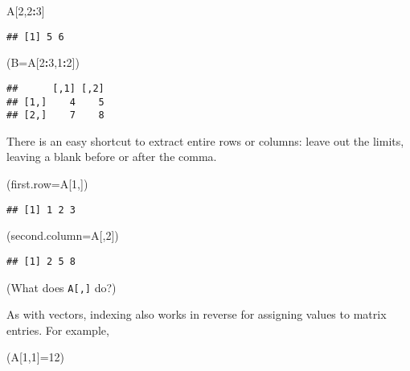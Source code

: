 \documentclass[11pt,]{article}
\newenvironment{Shaded}{\begin{snugshade}}{\end{snugshade}}
\newcommand{\DataTypeTok}[1]{\textcolor[rgb]{0.13,0.29,0.53}{#1}}
\newcommand{\DecValTok}[1]{\textcolor[rgb]{0.00,0.00,0.81}{#1}}
\newcommand{\OperatorTok}[1]{\textcolor[rgb]{0.81,0.36,0.00}{\textbf{#1}}}
\newcommand{\NormalTok}[1]{#1}
\begin{document}
\begin{Shaded}
\begin{Highlighting}[]
\NormalTok{A[}\DecValTok{2}\NormalTok{,}\DecValTok{2}\OperatorTok{:}\DecValTok{3}\NormalTok{]}
\end{Highlighting}
\end{Shaded}

\begin{verbatim}
## [1] 5 6
\end{verbatim}

\begin{Shaded}
\begin{Highlighting}[]
\NormalTok{(}\DataTypeTok{B=}\NormalTok{A[}\DecValTok{2}\OperatorTok{:}\DecValTok{3}\NormalTok{,}\DecValTok{1}\OperatorTok{:}\DecValTok{2}\NormalTok{])}
\end{Highlighting}
\end{Shaded}

\begin{verbatim}
##      [,1] [,2]
## [1,]    4    5
## [2,]    7    8
\end{verbatim}

There is an easy shortcut to extract entire rows or columns: leave out
the limits, leaving a blank before or after the comma.

\begin{Shaded}
\begin{Highlighting}[]
\NormalTok{(}\DataTypeTok{first.row=}\NormalTok{A[}\DecValTok{1}\NormalTok{,])}
\end{Highlighting}
\end{Shaded}

\begin{verbatim}
## [1] 1 2 3
\end{verbatim}

\begin{Shaded}
\begin{Highlighting}[]
\NormalTok{(}\DataTypeTok{second.column=}\NormalTok{A[,}\DecValTok{2}\NormalTok{])}
\end{Highlighting}
\end{Shaded}

\begin{verbatim}
## [1] 2 5 8
\end{verbatim}

(What does \texttt{A{[},{]}} do?)

As with vectors, indexing also works in reverse for assigning values to
matrix entries. For example,

\begin{Shaded}
\begin{Highlighting}[]
\NormalTok{(A[}\DecValTok{1}\NormalTok{,}\DecValTok{1}\NormalTok{]=}\DecValTok{12}\NormalTok{)}
\end{Highlighting}
\end{Shaded}
\end{document}
